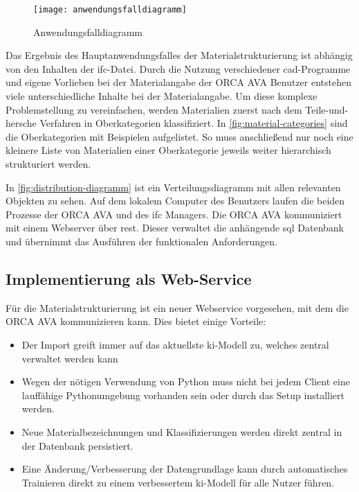 \begin{figure}[h]
	\centering
	\texttt{[image: anwendungsfalldiagramm]}
	\caption{Anwendungsfalldiagramm}
	\label{fig:usecasediagramm}
\end{figure}

Das Ergebnis des Hauptanwendungsfalles der Materialstrukturierung ist abhängig von den Inhalten der \ac{ifc}-Datei. Durch die Nutzung verschiedener \ac{cad}-Programme und eigene Vorlieben bei der Materialangabe der ORCA AVA Benutzer entstehen viele unterschiedliche Inhalte bei der Materialangabe. Um diese komplexe Problemstellung zu vereinfachen, werden Materialien zuerst nach dem \glqq Teile-und-hersche\grqq{} Verfahren in Oberkategorien klassifiziert. In \autoref{fig:material-categories} sind die Oberkategorien mit Beispielen aufgelistet. So muss anschließend nur noch eine kleinere Liste von Materialien einer Oberkategorie jeweils weiter hierarchisch strukturiert werden.

In \autoref{fig:distribution-diagramm} ist ein Verteilungsdiagramm mit allen relevanten Objekten zu sehen. Auf dem lokalem Computer des Benutzers laufen die beiden Prozesse der ORCA AVA und des \ac{ifc} Managers. Die ORCA AVA kommuniziert mit einem Webserver über \ac{rest}. Dieser verwaltet die anhängende \ac{sql} Datenbank und übernimmt das Ausführen der funktionalen Anforderungen.

\subsection{Implementierung als Web-Service}
\label{c:conception:architecture:service}
Für die Materialstrukturierung ist ein neuer Webservice vorgesehen, mit dem die ORCA AVA kommunizieren kann. Dies bietet einige Vorteile:

\begin{itemize}
	\setlength\itemsep{0.3em}
	\item Der Import greift immer auf das aktuellste \ac{ki}-Modell zu, welches zentral verwaltet werden kann
	\item Wegen der nötigen Verwendung von Python muss nicht bei jedem Client eine lauffähige Pythonumgebung vorhanden sein oder durch das Setup installiert werden.
	\item Neue Materialbezeichnungen und Klassifizierungen werden direkt zentral in der Datenbank persistiert.
	\item Eine Änderung/Verbesserung der Datengrundlage kann durch automatisches Trainieren direkt zu einem verbessertem \ac{ki}-Modell für alle Nutzer führen.
\end{itemize}

